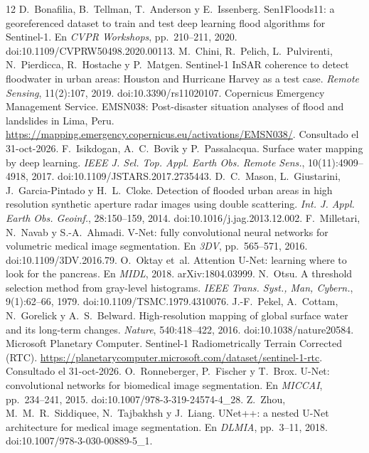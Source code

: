 \documentclass{article}
\begin{document}
\begin{thebibliography}{12}
 D.~Bonafilia, B.~Tellman, T.~Anderson y E.~Issenberg. Sen1Floods11: a georeferenced dataset to train and test deep learning flood algorithms for Sentinel-1. En \emph{CVPR Workshops}, pp.~210--211, 2020. doi:10.1109/CVPRW50498.2020.00113.
 M.~Chini, R.~Pelich, L.~Pulvirenti, N.~Pierdicca, R.~Hostache y P.~Matgen. Sentinel-1 InSAR coherence to detect floodwater in urban areas: Houston and Hurricane Harvey as a test case. \emph{Remote Sensing}, 11(2):107, 2019. doi:10.3390/rs11020107.
 Copernicus Emergency Management Service. EMSN038: Post-disaster situation analyses of flood and landslides in Lima, Peru. \url{https://mapping.emergency.copernicus.eu/activations/EMSN038/}. Consultado el 31-oct-2026.
 F.~Isikdogan, A.~C.~Bovik y P.~Passalacqua. Surface water mapping by deep learning. \emph{IEEE J. Sel. Top. Appl. Earth Obs. Remote Sens.}, 10(11):4909--4918, 2017. doi:10.1109/JSTARS.2017.2735443.
 D.~C.~Mason, L.~Giustarini, J.~Garcia-Pintado y H.~L.~Cloke. Detection of flooded urban areas in high resolution synthetic aperture radar images using double scattering. \emph{Int. J. Appl. Earth Obs. Geoinf.}, 28:150--159, 2014. doi:10.1016/j.jag.2013.12.002.
 F.~Milletari, N.~Navab y S.-A.~Ahmadi. V-Net: fully convolutional neural networks for volumetric medical image segmentation. En \emph{3DV}, pp.~565--571, 2016. doi:10.1109/3DV.2016.79.
 O.~Oktay et~al. Attention U-Net: learning where to look for the pancreas. En \emph{MIDL}, 2018. arXiv:1804.03999.
 N.~Otsu. A threshold selection method from gray-level histograms. \emph{IEEE Trans. Syst., Man, Cybern.}, 9(1):62--66, 1979. doi:10.1109/TSMC.1979.4310076.
 J.-F.~Pekel, A.~Cottam, N.~Gorelick y A.~S.~Belward. High-resolution mapping of global surface water and its long-term changes. \emph{Nature}, 540:418--422, 2016. doi:10.1038/nature20584.
 Microsoft Planetary Computer. Sentinel-1 Radiometrically Terrain Corrected (RTC). \url{https://planetarycomputer.microsoft.com/dataset/sentinel-1-rtc}. Consultado el 31-oct-2026.
 O.~Ronneberger, P.~Fischer y T.~Brox. U-Net: convolutional networks for biomedical image segmentation. En \emph{MICCAI}, pp.~234--241, 2015. doi:10.1007/978-3-319-24574-4\_28.
 Z.~Zhou, M.~M.~R.~Siddiquee, N.~Tajbakhsh y J.~Liang. UNet++: a nested U-Net architecture for medical image segmentation. En \emph{DLMIA}, pp.~3--11, 2018. doi:10.1007/978-3-030-00889-5\_1.
\end{thebibliography}
\end{document}
